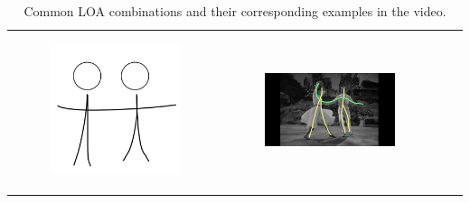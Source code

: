 \begin{table}[!htb]
\begin{tabular}{cccc}
\begin{subfigure}{0.2\textwidth}\centering\includegraphics[scale=0.1]{img/10keyframe}\end{subfigure}&
\begin{subfigure}{0.23\textwidth}\centering\includegraphics[scale=0.08]{img/keyframe_case_10_(5)}\end{subfigure}\\

\end{tabular}
\caption{Common LOA combinations and their corresponding examples in the video.}
\label{tab:combos}
\end{table}


